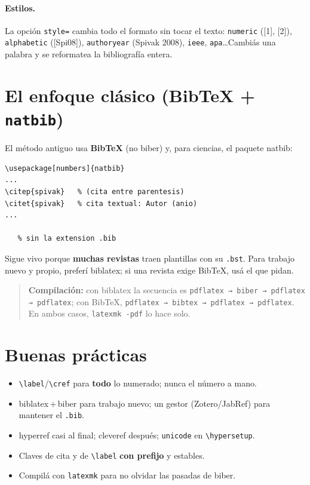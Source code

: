\documentclass[11pt,a4paper]{article}
\newcommand{\C}[1]{\texttt{\textbackslash #1}}
\newcommand{\pkg}[1]{\textsf{#1}}
\begin{document}
\paragraph{Estilos.} La opción \texttt{style=} cambia todo el formato sin tocar el
texto: \texttt{numeric} ([1], [2]), \texttt{alphabetic} ([Spi08]),
\texttt{authoryear} (Spivak 2008), \texttt{ieee}, \texttt{apa}\dots Cambiás una
palabra y se reformatea la bibliografía entera.

\section{El enfoque clásico (BibTeX + \texttt{natbib})}
El método antiguo usa \textbf{BibTeX} (no biber) y, para ciencias, el paquete
\pkg{natbib}:
\begin{lstlisting}
\usepackage[numbers]{natbib}
...
\citep{spivak}   % (cita entre parentesis)
\citet{spivak}   % cita textual: Autor (anio)
...

   % sin la extension .bib
\end{lstlisting}
Sigue vivo porque \textbf{muchas revistas} traen plantillas con su \texttt{.bst}.
Para trabajo nuevo y propio, preferí \pkg{biblatex}; si una revista exige BibTeX,
usá el que pidan.

\begin{quote}\small
\textbf{Compilación:} con \pkg{biblatex} la secuencia es
\texttt{pdflatex → biber → pdflatex → pdflatex}; con BibTeX,
\texttt{pdflatex → bibtex → pdflatex → pdflatex}. En ambos casos,
\texttt{latexmk -pdf} lo hace solo.
\end{quote}

\section{Buenas prácticas}
\begin{itemize}[noitemsep,leftmargin=*]
  \item \C{label}/\C{cref} para \textbf{todo} lo numerado; nunca el número a mano.
  \item \pkg{biblatex}\,+\,biber para trabajo nuevo; un gestor (Zotero/JabRef)
        para mantener el \texttt{.bib}.
  \item \pkg{hyperref} casi al final; \pkg{cleveref} después; \texttt{unicode} en
        \C{hypersetup}.
  \item Claves de cita y de \C{label} \textbf{con prefijo} y estables.
  \item Compilá con \texttt{latexmk} para no olvidar las pasadas de biber.
\end{itemize}
\end{document}

